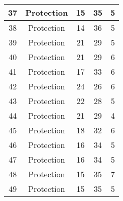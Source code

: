\documentclass[results.tex]{subfiles}
\begin{document}
\begin{center}
\begin{tabular}{| c || c | c | c | c |}
            \hline
            37                      & Protection                   & 15                     & 35                      & 5                    \\
            \hline
            38                      & Protection                   & 14                     & 36                      & 5                    \\
            \hline
            39                      & Protection                   & 21                     & 29                      & 5                    \\
            \hline
            40                      & Protection                   & 21                     & 29                      & 6                    \\
            \hline
            41                      & Protection                   & 17                     & 33                      & 6                    \\
            \hline
            42                      & Protection                   & 24                     & 26                      & 6                    \\
            \hline
            43                      & Protection                   & 22                     & 28                      & 5                    \\
            \hline
            44                      & Protection                   & 21                     & 29                      & 4                    \\
            \hline
            45                      & Protection                   & 18                     & 32                      & 6                    \\
            \hline
            46                      & Protection                   & 16                     & 34                      & 5                    \\
            \hline
            47                      & Protection                   & 16                     & 34                      & 5                    \\
            \hline
            48                      & Protection                   & 15                     & 35                      & 7                    \\
            \hline
            49                      & Protection                   & 15                     & 35                      & 5                    \\
            \hline
        \end{tabular}
    \end{center}
\end{document}
